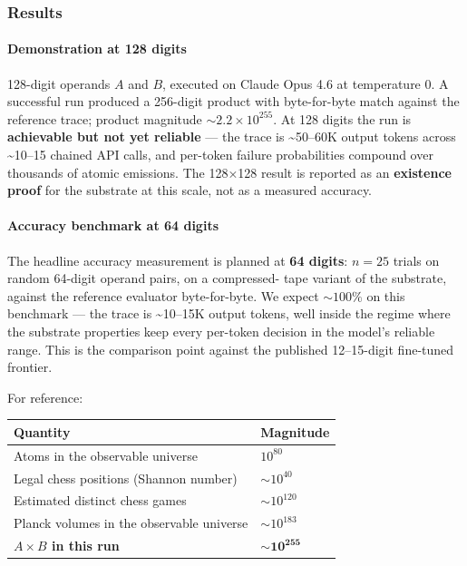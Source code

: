 \documentclass[twocolumn,switch,10pt]{article}
\begin{document}
\subsubsection{Results}\label{results}

\paragraph{Demonstration at 128 digits}\label{demonstration-at-128-digits}

128-digit operands \(A\) and \(B\), executed on Claude Opus 4.6 at
temperature 0. A successful run produced a 256-digit product with
byte-for-byte match against the reference trace; product magnitude
\(\sim 2.2 \times 10^{255}\). At 128 digits the run is \textbf{achievable
but not yet reliable} --- the trace is \textasciitilde50--60K output tokens across
\textasciitilde10--15 chained API calls, and per-token failure probabilities
compound over thousands of atomic emissions. The 128×128 result is
reported as an \textbf{existence proof} for the substrate at this scale,
not as a measured accuracy.

\paragraph{Accuracy benchmark at 64 digits}\label{accuracy-benchmark-at-64-digits}

The headline accuracy measurement is planned at \textbf{64 digits}:
\(n = 25\) trials on random 64-digit operand pairs, on a compressed-
tape variant of the substrate, against the reference evaluator
byte-for-byte. We expect \(\sim 100\%\) on this benchmark --- the
trace is \textasciitilde10--15K output tokens, well inside the regime where the
substrate properties keep every per-token decision in the model's
reliable range. This is the comparison point against the published
12--15-digit fine-tuned frontier.

For reference:

{\def\LTcaptype{none} %
\begin{table}[t]
\centering

\begin{tabular}{@{}ll@{}}\toprule
Quantity & Magnitude \\
\midrule

Atoms in the observable universe & \(10^{80}\) \\
Legal chess positions (Shannon number) & \(\sim 10^{40}\) \\
Estimated distinct chess games & \(\sim 10^{120}\) \\
Planck volumes in the observable universe & \(\sim 10^{183}\) \\
\textbf{\(A \times B\) in this run} & \(\mathbf{\sim 10^{255}}\) \\
\bottomrule
\end{tabular}
\end{table}
}
\end{document}
